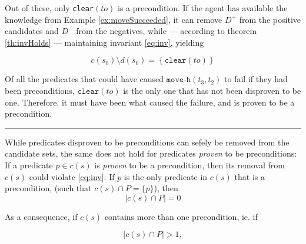 \documentclass[../../Master.tex]{subfiles}
\begin{document}
\begin{example}
    Out of these, only \texttt{clear}$(to)$ is a precondition. If the agent has available the knowledge from Example \ref{ex:moveSucceeded}, it can remove $D^+$ from the positive candidates and $D^-$ from the negatives, while --- according to theorem \ref{th:invHolds} --- maintaining invariant \eqref{eq:inv}, yielding

    \begin{equation}
        c(s_0) \setminus d(s_0) = \left\{ \texttt{clear}(to) \right\}
    \end{equation}


    Of all the predicates that could have caused $\texttt{move-h}(t_3, t_2)$ to fail if they had been preconditions, $\texttt{clear}(to)$ is the only one that has not been disproven to be one. Therefore, it must have been what caused the failure, and is proven to be a precondition.

    \noindent\rule{\textwidth}{1pt}
\end{example}

While predicates disproven to be preconditions can sefely be removed from the candidate sets, the same does not hold for predicates \emph{proven} to be preconditions:
If a predicate $p \in c(s)$ is \textit{proven} to be a precondition, then its removal from $c(s)$ could violate \eqref{eq:inv}: If $p$ is the only predicate in $c(s)$ that is a precondition, (such that $c(s) \cap P = \{ p \}$), then
\begin{equation*}
    \left| c(s) \cap P \right| = 0
\end{equation*}

As a consequence, if $c(s)$ contains more than one precondition, ie. if

\begin{equation*}
    \left| c(s) \cap P \right| > 1,
\end{equation*}
\end{document}
